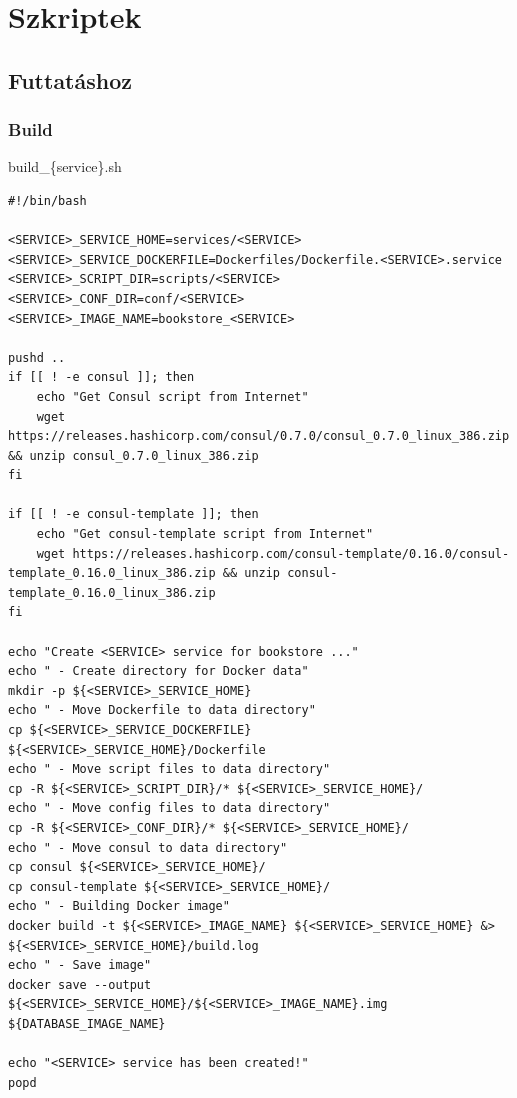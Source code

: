\documentclass[11pt,magyar,a4paper,twoside,]{report}
\begin{document}
\section{Szkriptek}\label{szkriptek}

\subsection{Futtatáshoz}\label{futtatuxe1shoz}

\subsubsection{\texorpdfstring{Build\label{appendix-build}}{Build}}\label{build}

build\_\{service\}.sh

\begin{verbatim}
#!/bin/bash

<SERVICE>_SERVICE_HOME=services/<SERVICE>
<SERVICE>_SERVICE_DOCKERFILE=Dockerfiles/Dockerfile.<SERVICE>.service
<SERVICE>_SCRIPT_DIR=scripts/<SERVICE>
<SERVICE>_CONF_DIR=conf/<SERVICE>
<SERVICE>_IMAGE_NAME=bookstore_<SERVICE>

pushd ..
if [[ ! -e consul ]]; then
    echo "Get Consul script from Internet"
    wget https://releases.hashicorp.com/consul/0.7.0/consul_0.7.0_linux_386.zip && unzip consul_0.7.0_linux_386.zip
fi

if [[ ! -e consul-template ]]; then
    echo "Get consul-template script from Internet"
    wget https://releases.hashicorp.com/consul-template/0.16.0/consul-template_0.16.0_linux_386.zip && unzip consul-template_0.16.0_linux_386.zip
fi

echo "Create <SERVICE> service for bookstore ..."
echo " - Create directory for Docker data"
mkdir -p ${<SERVICE>_SERVICE_HOME}
echo " - Move Dockerfile to data directory"
cp ${<SERVICE>_SERVICE_DOCKERFILE} ${<SERVICE>_SERVICE_HOME}/Dockerfile
echo " - Move script files to data directory"
cp -R ${<SERVICE>_SCRIPT_DIR}/* ${<SERVICE>_SERVICE_HOME}/
echo " - Move config files to data directory"
cp -R ${<SERVICE>_CONF_DIR}/* ${<SERVICE>_SERVICE_HOME}/
echo " - Move consul to data directory"
cp consul ${<SERVICE>_SERVICE_HOME}/
cp consul-template ${<SERVICE>_SERVICE_HOME}/
echo " - Building Docker image"
docker build -t ${<SERVICE>_IMAGE_NAME} ${<SERVICE>_SERVICE_HOME} &> ${<SERVICE>_SERVICE_HOME}/build.log
echo " - Save image"
docker save --output ${<SERVICE>_SERVICE_HOME}/${<SERVICE>_IMAGE_NAME}.img ${DATABASE_IMAGE_NAME}

echo "<SERVICE> service has been created!"
popd
\end{verbatim}
\end{document}
